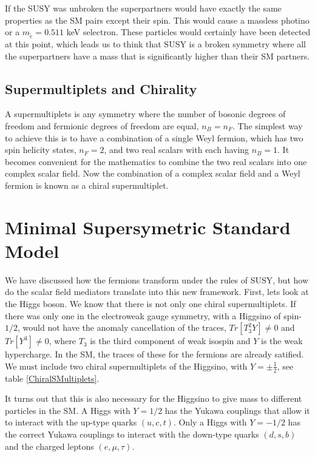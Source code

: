 If the SUSY was unbroken the superpartners would have exactly the same properties as the SM pairs except their spin. This would cause a massless photino or a $m_{\widetilde{e}}=0.511$ keV selectron. These particles would certainly have been detected at this point, which leads us to think that SUSY is a broken symmetry where all the superpartners have a mass that is significantly higher than their SM partners. 

\subsection{Supermultiplets and Chirality}
\label{subsec:chiral}

A supermultiplets is any symmetry where the number of bosonic degrees of freedom and fermionic degrees of freedom are equal, $n_B=n_F$. The simplest  way to achieve this is to have a combination of a single Weyl fermion, which has two spin helicity states, $n_F=2$, and two real scalars with each having $n_B=1$. It becomes convenient for the mathematics to combine the two real scalars into one complex scalar field. Now the combination of a complex scalar field and a Weyl fermion is known as a chiral supermultiplet. 

\section{Minimal Supersymetric Standard Model}
\label{sec:MSSM}

We have discussed how the fermions transform under the rules of SUSY, but how do the scalar field mediators translate into this new framework. First, lets look at the Higgs boson. We know that there is not only one chiral supermultiplets. If there was only one in the electroweak gauge symmetry, with a Higgsino of spin-$1/2$, would not have the anomaly cancellation of the traces, $Tr[T^2_3Y]\neq0$ and $Tr[Y^3]\neq0$, where $T_3$ is the third component of weak isospin and $Y$ is the weak hypercharge. In the SM, the traces of these for the fermions are already satified. We must include two chiral supermultiplets of the Higgsino, with $Y=\pm\frac{1}{2}$, see table \ref{ChiralSMultiplets}. 

It turns out that this is also necessary for the Higgsino to give mass to different particles in the SM. A Higgs with $Y=1/2$ has the Yukawa couplings that allow it to interact with the up-type quarks $(u, c, t)$. Only a Higgs with $Y=-1/2$ has the correct Yukawa couplings to interact with the down-type quarks $(d, s, b)$ and the charged leptons $(e, \mu, \tau)$.

